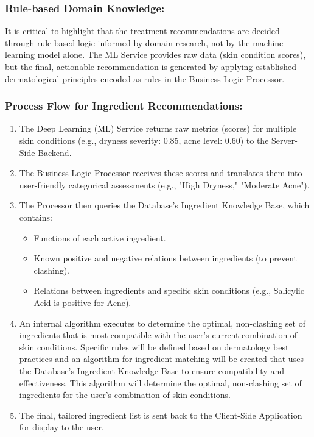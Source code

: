 \documentclass[12pt,a4paper]{article}
\begin{document}
\subsubsection{Rule-based Domain Knowledge:}
It is critical to highlight that the treatment recommendations are decided through rule-based logic informed by domain research, not by the machine learning model alone. The ML Service provides raw data (skin condition scores), but the final, actionable recommendation is generated by applying established dermatological principles encoded as rules in the Business Logic Processor.

\subsubsection{Process Flow for Ingredient Recommendations:}
\begin{enumerate}
    \item The Deep Learning (ML) Service returns raw metrics (scores) for multiple skin conditions (e.g., dryness severity: 0.85, acne level: 0.60) to the Server-Side Backend.
    \item The Business Logic Processor receives these scores and translates them into user-friendly categorical assessments (e.g., "High Dryness," "Moderate Acne").
    \item The Processor then queries the Database's Ingredient Knowledge Base, which contains:
    \begin{itemize}
        \item Functions of each active ingredient.
        \item Known positive and negative relations between ingredients (to prevent clashing).
        \item Relations between ingredients and specific skin conditions (e.g., Salicylic Acid is positive for Acne).
    \end{itemize}
    \item An internal algorithm executes to determine the optimal, non-clashing set of ingredients that is most compatible with the user's current combination of skin conditions. Specific rules will be defined based on dermatology best practices and an algorithm for ingredient matching will be created that uses the Database's Ingredient Knowledge Base to ensure compatibility and effectiveness. This algorithm will determine the optimal, non-clashing set of ingredients for the user's combination of skin conditions.
    \item The final, tailored ingredient list is sent back to the Client-Side Application for display to the user.
\end{enumerate}
\end{document}
